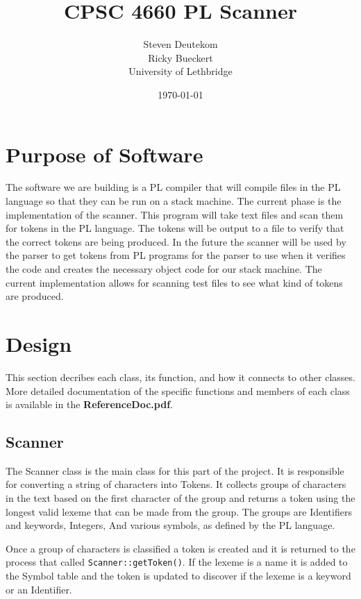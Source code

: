 \documentclass{article}
\begin{document}
\title{CPSC 4660 PL Scanner}
\author{Steven Deutekom\\
        Ricky Bueckert\\
        University of Lethbridge}
\date{\today}

\maketitle

\section{Purpose of Software}
The software we are building is a PL compiler that will compile files in the PL
language so that they can be run on a stack machine. The current phase is the
implementation of the scanner. This program will take text files and scan them
for tokens in the PL language. The tokens will be output to a file to verify
that the correct tokens are being produced. In the future the scanner will be
used by the parser to get tokens from PL programs for the parser to use when
it verifies the code and creates the necessary object code for our stack machine.
The current implementation allows for scanning test files to see what kind of tokens
are produced.


\section{Design}
This section decribes each class, its function, and how it connects to other classes.
More detailed documentation of the specific functions and members of each class
is available in the \textbf{ReferenceDoc.pdf}.

\subsection{Scanner}
The Scanner class is the main class for this part of the project. It is responsible
for converting a string of characters into Tokens. It collects groups of characters
in the text based on the first character of the group and returns a token
using the longest valid lexeme that can be made from the group. The groups
are Identifiers and keywords, Integers, And various symbols, as defined by the
PL language.

Once a group of characters is classified a token is created and it is returned
to the process that called \verb|Scanner::getToken()|. If the lexeme is a name
it is added to the Symbol table and the token is updated to discover if the
lexeme is a keyword or an Identifier.
\end{document}
